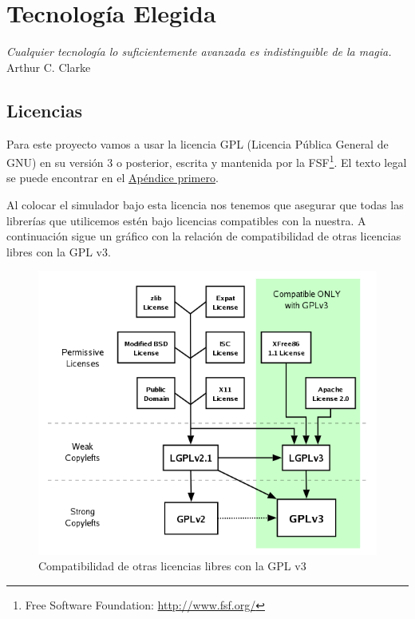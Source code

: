 \chapter{Tecnología Elegida} \label{cap4}

\begin{flushright}
\begin{minipage}{7.85cm}
    {\em Cualquier tecnología lo suficientemente avanzada es indistinguible de
    la magia.} \\ Arthur C. Clarke
\end{minipage}
\end{flushright}

\vspace*{5mm}

\section{Licencias}

Para este proyecto vamos a usar la licencia GPL (Licencia Pública General de
GNU) en su versión 3 o posterior, escrita y mantenida por la FSF\footnote{Free
Software Foundation: \url{http://www.fsf.org/}}. El texto legal se puede
encontrar en el \hyperref[ap1]{Apéndice primero}.

Al colocar el simulador bajo esta licencia nos tenemos que asegurar que todas
las librerías que utilicemos estén bajo licencias compatibles con la nuestra. A
continuación sigue un gráfico con la relación de compatibilidad de otras
licencias libres con la GPL v3.

\begin{figure}[H]
 \centering
 \includegraphics[width=120mm]{figuras/cap4/gplv3_comp.png}
 \caption{Compatibilidad de otras licencias libres con la GPL v3}
\end{figure}


